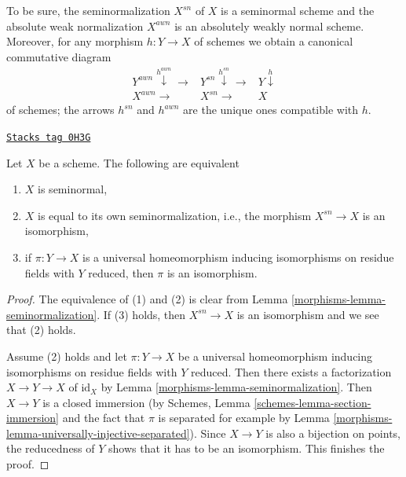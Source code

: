 To be sure, the seminormalization $X^{sn}$ of $X$ is a seminormal
scheme and the absolute weak normalization $X^{awn}$ is an
absolutely weakly normal scheme.
Moreover, for any morphism $h : Y \to X$ of schemes we obtain a
canonical commutative diagram
$$
\begin{array}{ccc}Y^{awn} \overset{h^{awn}}{\downarrow}\longrightarrow & Y^{sn} \overset{h^{sn}}{\downarrow}\longrightarrow & Y \overset{h}{\downarrow} \\ X^{awn} \longrightarrow & X^{sn} \longrightarrow & X\end{array}
$$
of schemes; the arrows $h^{sn}$ and $h^{awn}$ are the unique
ones compatible with $h$.

\begin{lemma}
\label{morphisms-lemma-characterize-seminormal}
\href{https://stacks.math.columbia.edu/tag/0H3G}{\texttt{Stacks tag 0H3G}}

Let $X$ be a scheme. The following are equivalent
\begin{enumerate}
\item $X$ is seminormal,
\item $X$ is equal to its own seminormalization, i.e., the morphism
$X^{sn} \to X$ is an isomorphism,
\item if $\pi : Y \to X$ is a universal homeomorphism inducing isomorphisms
on residue fields with $Y$ reduced, then $\pi$ is an isomorphism.
\end{enumerate}
\end{lemma}

\begin{proof}

The equivalence of (1) and (2) is clear from
Lemma \ref{morphisms-lemma-seminormalization}. If (3) holds, then $X^{sn} \to X$
is an isomorphism and we see that (2) holds.

\medskip\noindent
Assume (2) holds and let $\pi : Y \to X$ be a universal homeomorphism
inducing isomorphisms on residue fields with $Y$ reduced. Then there exists
a factorization $X \to Y \to X$ of $\text{id}_X$ by
Lemma \ref{morphisms-lemma-seminormalization}. Then $X \to Y$ is a closed immersion
(by Schemes, Lemma \ref{schemes-lemma-section-immersion}
and the fact that $\pi$ is separated for example by
Lemma \ref{morphisms-lemma-universally-injective-separated}). Since $X \to Y$
is also a bijection on points, the reducedness of $Y$ shows that it
has to be an isomorphism. This finishes the proof.
\end{proof}

